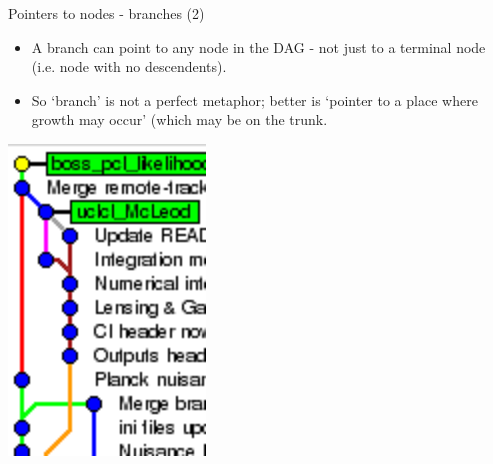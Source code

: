 \documentclass[usenames,dvipsnames]{beamer}
\begin{document}
\begin{frame}{Pointers to nodes - branches (2)}
  \begin{block}{}
    \begin{itemize}
      \item{A branch can point to any node in the DAG - not just to a terminal node (i.e. node with no descendents).}
      \item{So `branch' is not a perfect metaphor; better is `pointer to a place where growth may occur' (which may be on the trunk.}
    \end{itemize}
  \end{block}
  \begin{block}{}
    \begin{center}
      \includegraphics[scale=0.4]{Branch_3.png}
    \end{center}
  \end{block}
\end{frame}
\end{document}
